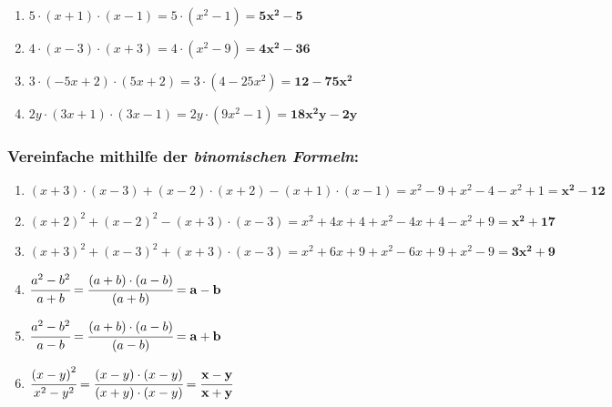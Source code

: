 \documentclass[a4paper,12pt]{article} %
\begin{document}
\begin{enumerate}[label=\alph*)]

  \item \(5 \cdot (x + 1) \cdot (x - 1) = 5 \cdot (x^2 - 1) = \mathbf{5x^2 - 5}\) %

  \item \(4 \cdot (x - 3) \cdot (x + 3) = 4 \cdot (x^2 - 9) = \mathbf{4x^2 - 36}\) %

  \item \(3 \cdot (-5x + 2) \cdot (5x + 2) = 3 \cdot (4 - 25x^2) = \mathbf{12 - 75x^2}\) %

  \item \(2y \cdot (3x + 1) \cdot (3x - 1) = 2y \cdot (9x^2 - 1) = \mathbf{18x^2y - 2y}\) %

\end{enumerate}

\subsubsection{Vereinfache mithilfe der \textit{binomischen Formeln}:} %

\begin{enumerate}[label=\alph*)]

  \item \((x + 3) \cdot (x - 3) + (x - 2) \cdot (x + 2) - (x + 1) \cdot (x - 1) =
    x^2 - 9 + x^2 - 4 - x^2 + 1 = \mathbf{x^2 - 12}\) %

  \item \({(x + 2)}^2 + {(x - 2)}^2 - (x + 3) \cdot (x - 3) =
    x^2 + 4x + 4 + x^2 - 4x + 4 - x^2 + 9 = \mathbf{x^2 + 17}\) %

  \item \({(x + 3)}^2 + {(x - 3)}^2 + (x + 3) \cdot (x - 3) =
    x^2 + 6x + 9 + x^2 - 6x + 9 + x^2 - 9 = \mathbf{3x^2 + 9}\) %

  \item \(\cfrac{a^2 - b^2}{a + b} = \cfrac{(a + b) \cdot (a - b)}{(a + b)} = \mathbf{a - b}\) %

  \item \(\cfrac{a^2 - b^2}{a - b} = \cfrac{(a + b) \cdot (a - b)}{(a - b)} = \mathbf{a + b}\) %

  \item \(\cfrac{{(x - y)}^2}{x^2 - y^2} = \cfrac{(x - y) \cdot (x - y)}{(x + y) \cdot (x - y)} = \mathbf{\cfrac{x - y}{x + y}}\) %

\end{enumerate}
\end{document}
